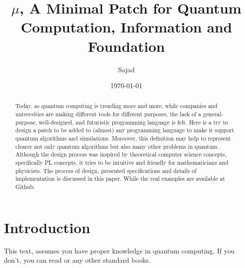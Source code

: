 \documentclass[a4paper,11pt]{article}
\title{\(\mu\), A Minimal Patch for Quantum Computation, Information and Foundation}
\author{Sajad}
\date{\today}
\begin{document}
\maketitle


\begin{abstract}
Today, as quantum computing is trending more and more, while companies and universities are making different tools for different purposes, the lack of a general-purpose, well-designed, and futuristic programming language is felt. 
Here is a try to design a patch to be added to (almost) any programming language to make it support quantum algorithms and simulations. Moreover, this definition may help to represent clearer not only quantum algorithms but also many other problems in quantum.
Although the design process was inspired by theoretical computer science concepts, specifically PL concepts, it tries to be intuitive and friendly for mathematicians and physicists.
The process of design, presented specifications and details of implementation is discussed in this paper. While the real examples are available at Github.
\end{abstract}
\clearpage

\tableofcontents
\clearpage

\section{Introduction}

This text, assumes you have proper knowledge in quantum computing. If you don't, you can read \cite{neilson} or any other standard books.
\end{document}
